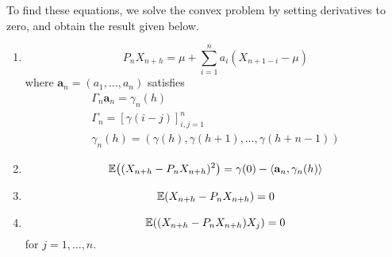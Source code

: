To find these equations, we solve the convex problem by setting
derivatives to zero, and obtain the result given below.

\begin{thm}
  \label{defn:stationary_processes:1}
  \begin{enumerate}
  \item
    \begin{equation}
      P_{n}X_{n+h} = \mu + \sum_{i=1}^{n} a_{i} (X_{n+1-i} - \mu)
    \end{equation} where $\mathbf{a}_{n} = (a_{1}, \dots, a_{n})$ satisfies
    \begin{align}
      \Gamma_{n} \mathbf{a}_{n} = \gamma_{n}(h) \\
      \Gamma_{n} = [\gamma(i - j)]^{n}_{i,j = 1} \\
      \gamma_{n}(h) = (\gamma(h), \gamma(h+1), \dots, \gamma(h + n - 1))
    \end{align}
  \item
    \begin{equation}
      \E{(X_{n+h} - P_{n} X_{n+h})^{2}} = \gamma(0) -
      \IP{\mathbf{a}_{n}, \gamma_{n}(h)}
    \end{equation}
  \item
    \begin{equation}
      \E{X_{n+h} - P_{n} X_{n+h}} = 0
    \end{equation}
  \item
    \begin{equation}
      \E{(X_{n+h} - P_{n} X_{n+h}) X_{j}} = 0
    \end{equation} for $j = 1, \dots, n$.
  \end{enumerate}
\end{thm}

